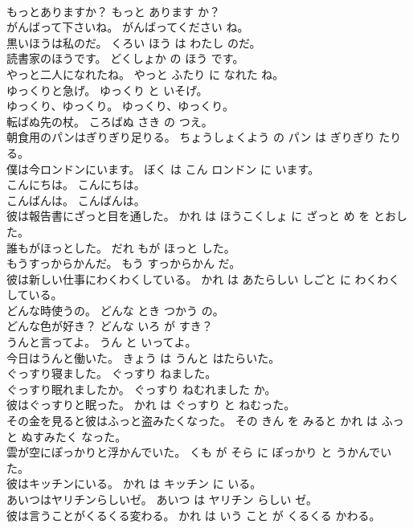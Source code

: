 \documentclass[8pt]{extreport}
\begin{document}
\begin{CJK}{UTF8}{min}
\\	もっとありますか？	もっと あります か？	
\\	がんばって下さいね。	がんばってください ね。	
\\	黒いほうは私のだ。	くろい ほう は わたし のだ。	
\\	読書家のほうです。	どくしょか の ほう です。	
\\	やっと二人になれたね。	やっと ふたり に なれた ね。	
\\	ゆっくりと急げ。	ゆっくり と いそげ。	
\\	ゆっくり、ゆっくり。	ゆっくり、ゆっくり。	
\\	転ばぬ先の杖。	ころばぬ さき の つえ。	
\\	朝食用のパンはぎりぎり足りる。	ちょうしょくよう の パン は ぎりぎり たりる。	
\\	僕は今ロンドンにいます。	ぼく は こん ロンドン に います。	
\\	こんにちは。	こんにちは。	
\\	こんばんは。	こんばんは。	
\\	彼は報告書にざっと目を通した。	かれ は ほうこくしょ に ざっと め を とおした。	
\\	誰もがほっとした。	だれ もが ほっと した。	
\\	もうすっからかんだ。	もう すっからかん だ。	
\\	彼は新しい仕事にわくわくしている。	かれ は あたらしい しごと に わくわく している。	
\\	どんな時使うの。	どんな とき つかう の。	
\\	どんな色が好き？	どんな いろ が すき？	
\\	うんと言ってよ。	うん と いってよ。	
\\	今日はうんと働いた。	きょう は うんと はたらいた。	
\\	ぐっすり寝ました。	ぐっすり ねました。	
\\	ぐっすり眠れましたか。	ぐっすり ねむれました か。	
\\	彼はぐっすりと眠った。	かれ は ぐっすり と ねむった。	
\\	その金を見ると彼はふっと盗みたくなった。	その きん を みると かれ は ふっと ぬすみたく なった。	
\\	雲が空にぽっかりと浮かんでいた。	くも が そら に ぽっかり と うかんでいた。	
\\	彼はキッチンにいる。	かれ は キッチン に いる。	
\\	あいつはヤリチンらしいゼ。	あいつ は ヤリチン らしい ゼ。	
\\	彼は言うことがくるくる変わる。	かれ は いう こと が くるくる かわる。	

\end{CJK}
\end{document}
